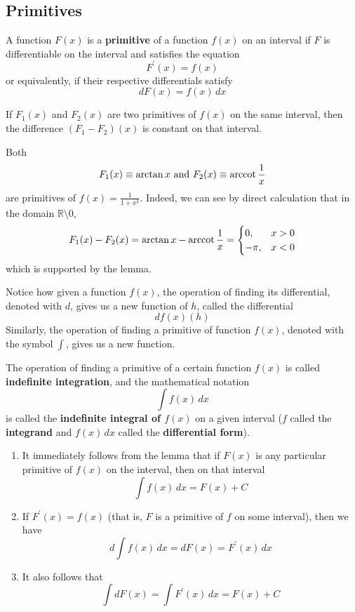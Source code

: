   \subsection{Primitives}

    \begin{definition}[Primitive]
      A function $F(x)$ is a \textbf{primitive} of a function $f(x)$ on an interval if $F$ is differentiable on the interval and satisfies the equation 
      \[F^\prime (x) = f(x)\]
      or equivalently, if their respective differentials satisfy
      \[d F(x) = f(x) \,dx\]
    \end{definition}

    \begin{lemma}
      If $F_1(x)$ and $F_2 (x)$ are two primitives of $f(x)$ on the same interval, then the difference $(F_1 - F_2)(x)$ is constant on that interval. 
    \end{lemma}

  \begin{example}
  Both 
  \[F_1(x) \equiv \arctan{x} \text{ and } F_2(x) \equiv \arccot{\frac{1}{x}}\]
  are primitives of $f(x) = \frac{1}{1 + x^2}$. Indeed, we can see by direct calculation that in the domain $\mathbb{R} \setminus 0$, 
  \[F_1 (x) - F_2 (x) = \arctan{x} - \arccot{\frac{1}{x}} = \begin{cases}
  0, & x > 0 \\
  -\pi, & x < 0
  \end{cases}\]
  which is supported by the lemma. 
  \end{example}

    Notice how given a function $f(x)$, the operation of finding its differential, denoted with $d$, gives us a new function of $h$, called the differential 
    \[df(x)(h)\]
    Similarly, the operation of finding a primitive of function $f(x)$, denoted with the symbol $\int$, gives us a new function. 

    \begin{definition}
      The operation of finding a primitive of a certain function $f(x)$ is called \textbf{indefinite integration}, and the mathematical notation 
      \[\int f(x) \,dx\]
      is called the \textbf{indefinite integral of $f(x)$} on a given interval ($f$ called the \textbf{integrand} and $f(x)\,dx$ called the \textbf{differential form}). 
      \begin{enumerate}
        \item It immediately follows from the lemma that if $F(x)$ is any particular primitive of $f(x)$ on the interval, then on that interval 
        \[\int f(x) \,dx = F(x) + C\]
        \item If $F^\prime (x) = f(x)$ (that is, $F$ is a primitive of $f$ on some interval), then we have
        \[d \int f(x)\,dx = d F(x) = F^\prime (x) \,dx \]
        \item It also follows that 
        \[\int d F(x) = \int F^\prime (x)\,dx = F(x) + C\]
      \end{enumerate}
    \end{definition}

